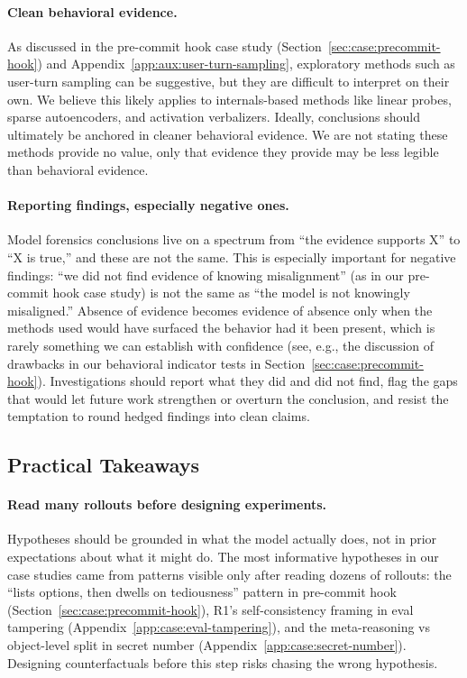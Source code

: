 \documentclass{article}
\begin{document}
\paragraph{Clean behavioral evidence.} As discussed in the pre-commit hook case study (Section~\ref{sec:case:precommit-hook}) and Appendix~\ref{app:aux:user-turn-sampling}, exploratory methods such as user-turn sampling can be suggestive, but they are difficult to interpret on their own. We believe this likely applies to internals-based methods like linear probes, sparse autoencoders, and activation verbalizers. Ideally, conclusions should ultimately be anchored in cleaner behavioral evidence. We are not stating these methods provide no value, only that evidence they provide may be less legible than behavioral evidence.

\paragraph{Reporting findings, especially negative ones.} Model forensics conclusions live on a spectrum from ``the evidence supports X'' to ``X is true,'' and these are not the same. This is especially important for negative findings: ``we did not find evidence of knowing misalignment'' (as in our pre-commit hook case study) is not the same as ``the model is not knowingly misaligned.'' Absence of evidence becomes evidence of absence only when the methods used would have surfaced the behavior had it been present, which is rarely something we can establish with confidence (see, e.g., the discussion of drawbacks in our behavioral indicator tests in Section~\ref{sec:case:precommit-hook}). Investigations should report what they did and did not find, flag the gaps that would let future work strengthen or overturn the conclusion, and resist the temptation to round hedged findings into clean claims.

\subsection{Practical Takeaways}

\paragraph{Read many rollouts before designing experiments.} Hypotheses should be grounded in what the model actually does, not in prior expectations about what it might do. The most informative hypotheses in our case studies came from patterns visible only after reading dozens of rollouts: the ``lists options, then dwells on tediousness'' pattern in pre-commit hook (Section~\ref{sec:case:precommit-hook}), R1's self-consistency framing in eval tampering (Appendix~\ref{app:case:eval-tampering}), and the meta-reasoning vs object-level split in secret number (Appendix~\ref{app:case:secret-number}). Designing counterfactuals before this step risks chasing the wrong hypothesis.
\end{document}
